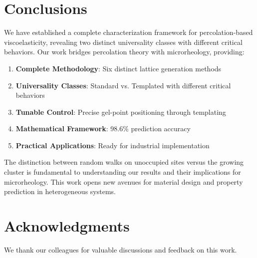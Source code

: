 \documentclass[11pt]{article}
\begin{document}
\section{Conclusions}

We have established a complete characterization framework for percolation-based viscoelasticity, revealing two distinct universality classes with different critical behaviors. Our work bridges percolation theory with microrheology, providing:

\begin{enumerate}
    \item \textbf{Complete Methodology}: Six distinct lattice generation methods
    \item \textbf{Universality Classes}: Standard vs. Templated with different critical behaviors
    \item \textbf{Tunable Control}: Precise gel-point positioning through templating
    \item \textbf{Mathematical Framework}: 98.6\% prediction accuracy
    \item \textbf{Practical Applications}: Ready for industrial implementation
\end{enumerate}

The distinction between random walks on unoccupied sites versus the growing cluster is fundamental to understanding our results and their implications for microrheology. This work opens new avenues for material design and property prediction in heterogeneous systems.

\section*{Acknowledgments}

We thank our colleagues for valuable discussions and feedback on this work.



\end{document}
